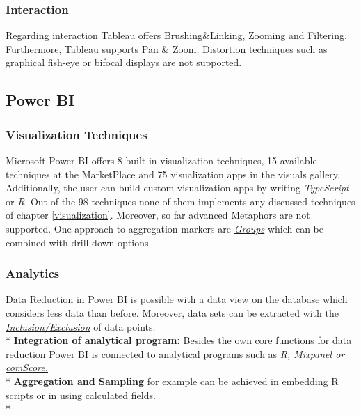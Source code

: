 \subsubsection*{Interaction}
Regarding interaction Tableau offers Brushing&Linking, Zooming and Filtering. Furthermore, Tableau supports Pan & Zoom. 
Distortion techniques such as graphical fish-eye or bifocal displays are not supported. 

\subsection*{Power BI}

\subsubsection*{Visualization Techniques}
Microsoft Power BI offers 8 built-in visualization techniques, 15 available techniques at the MarketPlace and 75 visualization apps in the visuals gallery. Additionally, the user can build custom visualization apps by writing \textit{TypeScript} or \textit{R}. Out of the 98 techniques none of them implements any discussed techniques of chapter \ref{visualization}. Moreover, so far advanced Metaphors are not supported\cite{Amanda}. One approach to aggregation markers are \hyperlink{https://Power BI.microsoft.com/de-de/blog/power-bi-desktop-october-feature-summary/#grouping}{\textit{Groups}} which can be combined with drill-down options.

\subsubsection*{Analytics}
Data Reduction in Power BI is possible with a data view on the database which considers less data than before. Moreover, data sets can be extracted with the \hyperlink{https://Power BI.microsoft.com/de-de/blog/power-bi-desktop-october-feature-summary/#grouping}{\textit{Inclusion/Exclusion}} of data points.\\*
\textbf{Integration of analytical program:} Besides the own core functions for data reduction Power BI is connected to analytical programs such as \hyperlink{https://Power BI.microsoft.com/de-de/blog/power-bi-desktop-october-feature-summary/#grouping}{\textit{R, Mixpanel or comScore.}}\\*
\textbf{Aggregation and Sampling} for example can be achieved in embedding R scripts or in using calculated fields. \\*
